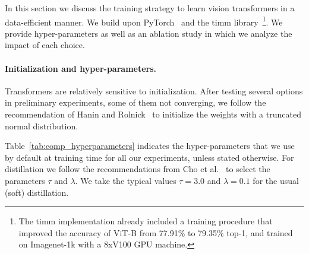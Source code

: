 In this section we discuss the \ours training strategy to learn vision transformers in a data-efficient manner. 
We build upon PyTorch~\cite{paszke2019pytorch} and the timm library~\cite{pytorchmodels}\footnote{The timm implementation already included a training procedure that improved the accuracy of ViT-B from 77.91\% to 79.35\% top-1, and trained  on Imagenet-1k with a 8xV100 GPU machine.}.
We provide hyper-parameters as well as an ablation study in which we analyze the impact of each choice. 

\paragraph{Initialization and hyper-parameters.}

Transformers are relatively sensitive to initialization. After testing several options in preliminary experiments, some of them not converging, we follow the recommendation of Hanin and Rolnick~\cite{hanin2018start} to initialize the weights with a truncated normal distribution. 

Table~\ref{tab:comp_hyperparameters} indicates the hyper-parameters that we use by default at training time for all our experiments, unless stated otherwise. 
% 
For distillation we follow the recommendations from Cho et al.~\cite{Cho2019OnTE} to select the parameters $\tau$ and $\lambda$. 
We take the typical values $\tau=3.0$ and $\lambda=0.1$ for the usual (soft) distillation.
%



